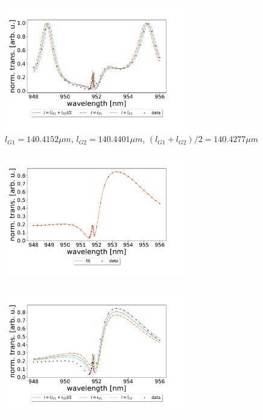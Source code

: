 \begin{figure}[h!]
    \centering
    \includegraphics[width=0.7\textwidth]{figures/results/129um_long_scan_sim_comparison.pdf}
    \caption{$l_{G1} = 140.4152 \mu m$, $l_{G2} = 140.4401 \mu m$, $(l_{G1} + l_{G2})/2 = 140.4277 \mu m$}
    \label{fig:129um_long_scan_sim_comparison}
\end{figure}

\begin{figure}[h!]
    \centering
    \includegraphics[width=0.7\textwidth]{figures/results/34um_long_scan_fit.pdf}
    \caption{}
    \label{fig:34um_long_scan_fit}
\end{figure}

\begin{figure}[h!]
    \centering
    \includegraphics[width=0.7\textwidth]{figures/results/34um_long_scan_sim_comparison.pdf}
    \caption{}
    \label{fig:34um_long_scan_sim_comparison}
\end{figure}


